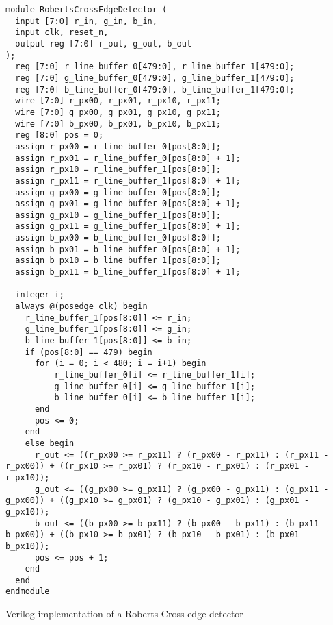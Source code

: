 \begin{listing}[H]
  \begin{verbatim}
module RobertsCrossEdgeDetector (
  input [7:0] r_in, g_in, b_in,
  input clk, reset_n,
  output reg [7:0] r_out, g_out, b_out
);
  reg [7:0] r_line_buffer_0[479:0], r_line_buffer_1[479:0];
  reg [7:0] g_line_buffer_0[479:0], g_line_buffer_1[479:0];
  reg [7:0] b_line_buffer_0[479:0], b_line_buffer_1[479:0];
  wire [7:0] r_px00, r_px01, r_px10, r_px11;
  wire [7:0] g_px00, g_px01, g_px10, g_px11;
  wire [7:0] b_px00, b_px01, b_px10, b_px11;
  reg [8:0] pos = 0;
  assign r_px00 = r_line_buffer_0[pos[8:0]];
  assign r_px01 = r_line_buffer_0[pos[8:0] + 1];
  assign r_px10 = r_line_buffer_1[pos[8:0]];
  assign r_px11 = r_line_buffer_1[pos[8:0] + 1];
  assign g_px00 = g_line_buffer_0[pos[8:0]];
  assign g_px01 = g_line_buffer_0[pos[8:0] + 1];
  assign g_px10 = g_line_buffer_1[pos[8:0]];
  assign g_px11 = g_line_buffer_1[pos[8:0] + 1];
  assign b_px00 = b_line_buffer_0[pos[8:0]];
  assign b_px01 = b_line_buffer_0[pos[8:0] + 1];
  assign b_px10 = b_line_buffer_1[pos[8:0]];
  assign b_px11 = b_line_buffer_1[pos[8:0] + 1];

  integer i;
  always @(posedge clk) begin
    r_line_buffer_1[pos[8:0]] <= r_in;
    g_line_buffer_1[pos[8:0]] <= g_in;
    b_line_buffer_1[pos[8:0]] <= b_in;
    if (pos[8:0] == 479) begin
      for (i = 0; i < 480; i = i+1) begin
          r_line_buffer_0[i] <= r_line_buffer_1[i];
          g_line_buffer_0[i] <= g_line_buffer_1[i];
          b_line_buffer_0[i] <= b_line_buffer_1[i];
      end
      pos <= 0;
    end
    else begin
      r_out <= ((r_px00 >= r_px11) ? (r_px00 - r_px11) : (r_px11 - r_px00)) + ((r_px10 >= r_px01) ? (r_px10 - r_px01) : (r_px01 - r_px10));
      g_out <= ((g_px00 >= g_px11) ? (g_px00 - g_px11) : (g_px11 - g_px00)) + ((g_px10 >= g_px01) ? (g_px10 - g_px01) : (g_px01 - g_px10));
      b_out <= ((b_px00 >= b_px11) ? (b_px00 - b_px11) : (b_px11 - b_px00)) + ((b_px10 >= b_px01) ? (b_px10 - b_px01) : (b_px01 - b_px10));
      pos <= pos + 1;
    end
  end
endmodule
  \end{verbatim}
  \caption{Verilog implementation of a Roberts Cross edge detector}\label{verilog.roberts_cross}
\end{listing}

